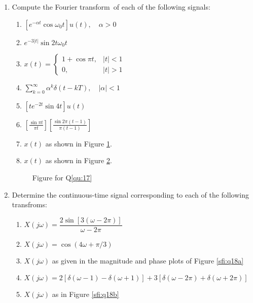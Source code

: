\documentclass[11pt]{article}
\newcommand\ft{Fourier transform}
\begin{document}
\begin{enumerate}
    \item  \label{qu:17} Compute the \ft~of each of the following signals:
    \begin{enumerate}
        \item $[e^{-\alpha t} \cos \omega_0 t]u(t),\quad \alpha >0$
        \item $e^{-3|t|} \sin 2t \omega_0 t$
        \item $x(t) = \begin{cases}1 + \cos \pi t,& |t| <1\\ 0, & |t|>1\end{cases}$
        \item $\sum_{k=0}^{\infty} \alpha^k \delta(t - kT), \quad |\alpha| < 1$
        \item  $[te^{-2 t} \sin  4t]u(t)$
        \item $\left[\frac{\sin \pi t}{\pi t}\right]\left[\frac{\sin 2\pi (t-1)}{\pi (t-1)}\right]$
        \item $x(t)$ as shown in Figure \ref{sfi:q17a}.
        \item $x(t)$ as shown in Figure \ref{sfi:q17b}.
    \end{enumerate}

    \begin{figure}
      \centering
        \begin{subfigure}[t]{0.3\textwidth}
            \centering
            
            \caption{}\label{sfi:q17a}
        \end{subfigure}%
        \hfill
        \begin{subfigure}[t]{0.7\textwidth}
            \centering
            
            \caption{}\label{sfi:q17b}
        \end{subfigure}
      \caption{Figure for Q\ref{qu:17}}\label{fi:q17}
    \end{figure}


    \item  \label{qu:18} Determine the continuous-time signal corresponding to each of the following transfroms:
    \begin{enumerate}
      \item $X(j\omega) = \dfrac{2\sin[3(\omega - 2\pi)]}{\omega - 2\pi}$
      \item $X(j\omega) = \cos(4\omega + \pi/3)$
      \item $X(j\omega)$ as given in the magnitude and phase plots of Figure \ref{sfi:q18a}
      \item $X(j\omega) = 2[\delta(\omega -1) - \delta(\omega + 1)] + 3[\delta(\omega -2\pi) + \delta(\omega + 2\pi)]$
      \item $X(j\omega)$ as  in Figure \ref{sfi:q18b}
    \end{enumerate}


\end{enumerate}
\end{document}

